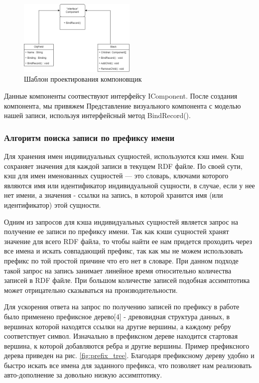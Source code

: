 \documentclass[12pt]{article}
\begin{document}
\begin{figure}[!ht]
    \centering
    \includegraphics[width=0.5\textwidth]{_images/composer_arch.png}
    \caption{Шаблон проектирования компоновщик}
    \label{fig:composer_pattern}
\end{figure}

Данные компоненты соотвествуют интерфейсу IComponent. После создания компонента, мы привяжем Представление визуального компонента с моделью нашей записи, используя интерфейсный метод BindRecord().

\subsubsection{Алгоритм поиска записи по префиксу имени}
\qquad Для хранения имен индивидуальных сущностей, используются кэш имен. Кэш сохраняет значения для каждой записи в текущем RDF файле. По своей сути, кэш для имен именованных сущностей — это словарь, ключами которого являются имя или идентификатор индивидуальной сущности, в случае, если у нее нет имени, а значения - ссылки на запись, в которой хранится имя (или идентификатор) этой сущности.

Одним из запросов для кэша индивидуальных сущностей является запрос на получение ее записи по префиксу имени. Так как кэши сущностей хранят значение для всего RDF файла, то чтобы найти ее нам придется проходить через все имена и искать совпадающий префикс, так как мы не можем использовать префикс по той простой причине что его нет в словаре. При данном подходе такой запрос на запись занимает линейное время относительно количества записей в RDF файле. При большом количестве записей подобная ассимптотика может отрицательно сказываться на производительности.

Для ускорения ответа на запрос по получению записей по префиксу в работе было применено префиксное дерево[4] - древовидная структура данных, в вершинах которой находятся ссылки на другие вершины, а каждому ребру соответствует символ. Изначально в префиксном дереве находится стартовая вершина, к которой добавляются ребра и другие вершины. Пример префиксного дерева приведен на рис. \ref{fig:prefix_tree}. Благодаря префиксному дереву удобно и быстро искать все имена для заданного префикса, что позволяет нам реализовать авто-дополнение за довольно низкую ассимптотику.
\end{document}
